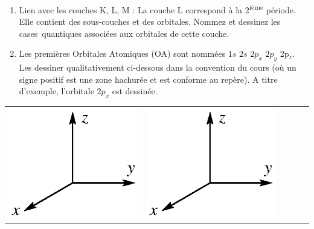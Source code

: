 \begin{enumerate}[\bf 1)]
\item Lien avec les couches K, L, M : La couche L correspond \`a la 2\textsuperscript{i\`eme} p\'eriode. Elle contient des
sous-couches et des orbitales. Nommez et dessinez les cases~quantiques associ\'ees aux orbitales de cette couche.
\item Les premi\`eres Orbitales Atomiques (OA) sont nomm\'ees $1s$ $2s$ $2p_x$ $2p_y$
2p$_z$. Les dessiner qualitativement ci-dessous dans la convention du cours (o\`u un signe positif est une
zone hachur\'ee et est conforme au rep\`ere). A titre d'exemple, l'orbitale $2p_x$ est dessin\'ee.
\end{enumerate}
%
\begin{center}
\begin{tabular}{ccccc}
\includegraphics[scale=0.6]{figure/repere_orbitale.eps} & \includegraphics[scale=0.6]{figure/repere_orbitale.eps} & \
\end{tabular}
\end{center}
